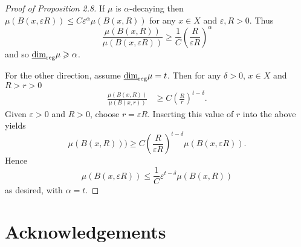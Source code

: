 \documentclass[12pt]{amsart}
\numberwithin{equation}{section}
\renewcommand{\ge}{\geqslant}
\renewcommand{\le}{\leqslant}
\newcommand{\lrdim}{\underline{\dim}_{\textup{reg}}}
\begin{document}
\begin{proof}[Proof of Proposition 2.8]
If $\mu$ is $\alpha$-decaying then $\mu(B(x,\varepsilon R)) \le C \varepsilon^{\alpha} \mu(B(x,R))$ for any $x\in X$ and $\varepsilon, R >0$. Thus
\[
\frac{\mu(B(x,R))}{\mu(B(x,\varepsilon R))} \ge \frac{1}{C} \left(\frac{R}{\varepsilon R} \right)^{\alpha}
\]
and so $\lrdim \mu \ge \alpha$.

For the other direction, assume $\lrdim \mu = t$. Then for any $\delta > 0$, $x\in X$ and $R>r>0$ 
\begin{align*}
    \frac{\mu(B(x,R))}{\mu(B(x,r))} &\ge C \left( \frac{R}{r}\right)^{t - \delta}.
\end{align*}
Given $\varepsilon > 0$ and $R > 0$, choose $r = \varepsilon R$. Inserting this value of $r$ into the above yields 
\[\mu(B(x,R))) \ge C \left(\frac{R}{\varepsilon R}\right)^{t-\delta} \mu(B(x,\varepsilon R)).
\]
Hence
\[
\mu(B(x,\varepsilon R)) \le \frac{1}{C} \varepsilon^{t - \delta} \mu(B(x,R))  
\]
as desired, with $\alpha = t$.
\end{proof}






\section*{Acknowledgements}






\end{document}
